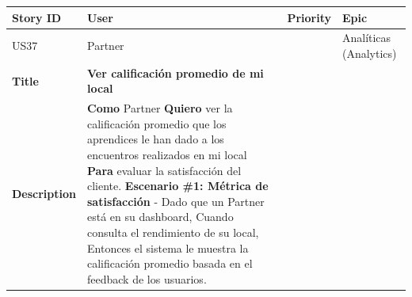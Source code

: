 {\def\LTcaptype{none} %
\begin{longtable}[]{@{}
  >{\raggedright\arraybackslash}p{}
  >{\raggedright\arraybackslash}p{}
  >{\raggedright\arraybackslash}p{}
  >{\raggedright\arraybackslash}p{}@{}}
\toprule\noalign{}
\begin{minipage}[b]{\linewidth}\raggedright
Story ID
\end{minipage} & \begin{minipage}[b]{\linewidth}\raggedright
User
\end{minipage} & \begin{minipage}[b]{\linewidth}\raggedright
Priority
\end{minipage} & \begin{minipage}[b]{\linewidth}\raggedright
Epic
\end{minipage} \\
\midrule\noalign{}
\endhead
\bottomrule\noalign{}
\endlastfoot
US37 & Partner & 3 & Analíticas (Analytics) \\
\textbf{Title} & \textbf{Ver calificación promedio de mi local} & & \\
\textbf{Description} & \textbf{Como} Partner \textbf{Quiero} ver la
calificación promedio que los aprendices le han dado a los encuentros
realizados en mi local \textbf{Para} evaluar la satisfacción del
cliente. \textbf{Escenario \#1: Métrica de satisfacción} - Dado que un
Partner está en su dashboard, Cuando consulta el rendimiento de su
local, Entonces el sistema le muestra la calificación promedio basada en
el feedback de los usuarios. & & \\
\end{longtable}
}


